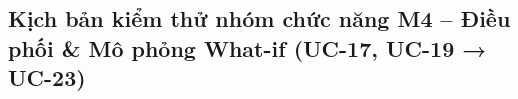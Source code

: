 \subsection{Kịch bản kiểm thử nhóm chức năng M4 – Điều phối \& Mô phỏng What-if (UC-17, UC-19 → UC-23)}
